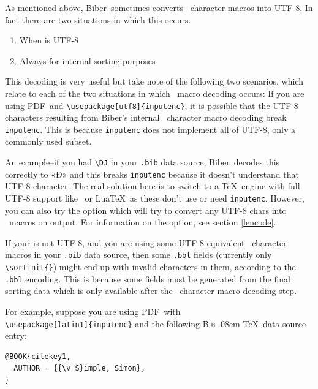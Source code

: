 \documentclass{ltxdockit}
\def\BibTeX{\textsc{Bib}\kern-.08em \TeX}
\newcommand*{\biber}{Biber\xspace}
\begin{document}
\noindent As mentioned above, \biber\ sometimes converts \latex\
character macros into UTF-8. In fact there are two situations in which
this occurs.

\begin{enumerate}
\item When  is UTF-8
\item Always for internal sorting purposes
\end{enumerate}

\noindent This decoding is very useful but take note of the following
two scenarios, which relate to each of the two situations in which
\latex\ macro decoding occurs:
\bigskip
{}
If you are using PDF\latex\ and \verb+\usepackage[utf8]{inputenc}+, it
is possible that the UTF-8 characters resulting from \biber's
internal \latex\ character macro decoding break \verb+inputenc+. This is
because \verb+inputenc+ does not implement all of UTF-8, only a
commonly used subset.

An example--if you had \verb+\DJ+ in your \verb+.bib+ data source,
\biber\ decodes this correctly to «Đ» and this breaks \verb+inputenc+
because it doesn't understand that UTF-8 character. The real solution here
is to switch to a \TeX\ engine with full UTF-8 support like \XeTeX\ or Lua\TeX\
as these don't use or need \verb+inputenc+. However, you can also try the
 option which will try to convert any UTF-8 chars into
\latex\ macros on output. For information on the \opt{--output\_safechars}
option, see section \ref{lencode}.
\bigskip
{}

If your  is not UTF-8, and you are using some UTF-8
equivalent \latex\ character macros in your \verb+.bib+ data source, then some
\verb+.bbl+ fields (currently only \verb+\sortinit{}+) might end up
with invalid characters in them, according to the \verb+.bbl+
encoding. This is because some fields must be generated from the final
sorting data which is only available after the \latex\ character macro
decoding step.

For example, suppose you are using PDF\latex\ with\\
\verb+\usepackage[latin1]{inputenc}+ and the following \BibTeX\
data source entry:

\begin{verbatim}
@BOOK{citekey1,
  AUTHOR = {{\v S}imple, Simon},
}
\end{verbatim}
\end{document}
